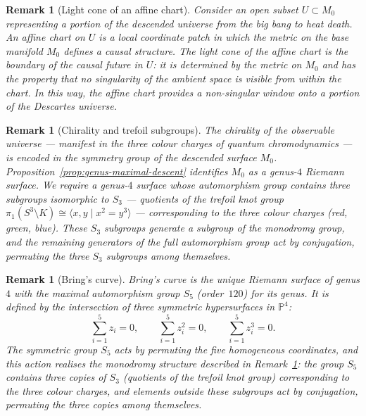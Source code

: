 \documentclass[12pt,a4paper]{report}
\newtheorem{remark}[theorem]{Remark}
\begin{document}
\begin{remark}[Light cone of an affine chart]
\label{rem:light-cone-affine}
Consider an open subset $U \subset M_0$ representing a portion of the
descended universe from the big bang to heat death.  An \emph{affine chart}
on $U$ is a local coordinate patch in which the metric on the base manifold
$M_0$ defines a causal structure.  The \emph{light cone} of the affine chart
is the boundary of the causal future in $U$: it is determined by the metric
on $M_0$ and has the property that no singularity of the ambient space is
visible from within the chart.  In this way, the affine chart provides a
non-singular window onto a portion of the Descartes universe.
\end{remark}



\begin{remark}[Chirality and trefoil subgroups]
\label{rem:chirality-trefoil}
The chirality of the observable universe --- manifest in the three colour
charges of quantum chromodynamics --- is encoded in the symmetry group of the
descended surface $M_0$.  Proposition~\ref{prop:genus-maximal-descent}
identifies $M_0$ as a genus-$4$ Riemann surface.  We require a genus-$4$
surface whose automorphism group contains three subgroups isomorphic to $S_3$
--- quotients of the trefoil knot group
$\pi_1(S^3 \setminus K) \cong \langle x, y \mid x^2 = y^3 \rangle$ ---
corresponding to the three colour charges (red, green, blue).  These $S_3$
subgroups generate a subgroup of the monodromy group, and the remaining
generators of the full automorphism group act by conjugation, permuting the
three $S_3$ subgroups among themselves.
\end{remark}

\begin{remark}[Bring's curve]
\label{rem:brings-curve}
Bring's curve is the unique Riemann surface of genus $4$ with the maximal
automorphism group $S_5$ (order~$120$) for its genus.  It is defined by
the intersection of three symmetric hypersurfaces in $\mathbb{P}^4$:
\[
  \sum_{i=1}^{5} z_i = 0,
  \qquad
  \sum_{i=1}^{5} z_i^2 = 0,
  \qquad
  \sum_{i=1}^{5} z_i^3 = 0.
\]
The symmetric group $S_5$ acts by permuting the five homogeneous coordinates,
and this action realises the monodromy structure described in
Remark~\ref{rem:chirality-trefoil}: the group $S_5$ contains three copies of
$S_3$ (quotients of the trefoil knot group) corresponding to the three
colour charges, and elements outside these subgroups act by conjugation,
permuting the three copies among themselves.
\end{remark}
\end{document}
